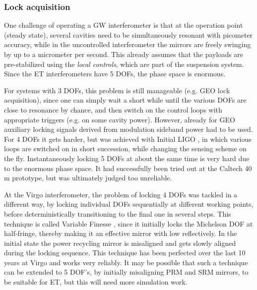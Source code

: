 

\subsubsection*{Lock acquisition}

One challenge of operating a GW interferometer is that at the operation point (steady state), several cavities need to be simultaneously resonant with picometer accuracy, while in the uncontrolled interferometer the mirrors are freely swinging by up to a micrometer per second. This already assumes that the payloads are pre-stabilized using the \emph{local controls}, which are part of the suspension system. Since the ET interferometers have 5 DOFs, the phase space is enormous.

For systems with 3 DOFs, this problem is still manageable (e.g. GEO lock acquisition), since one can simply wait a short while until the various DOFs are close to resonance by chance, and then switch on the control loops with appropriate triggers (e.g. on some cavity power). However, already for GEO auxiliary locking signals derived from modulation sideband power had to be used. For 4 DOFs it gets harder, but was achieved with Initial LIGO \cite{Evans2002}, in which various loops are switched on in short succession, while changing the sensing scheme on the fly. Instantaneously locking 5 DOFs at about the same time is very hard due to the enormous phase space. It had successfully been tried out at the Caltech 40\,m prototype, 
but was ultimately judged too unreliable.

At the Virgo interferometer, the problem of locking 4 DOFs was tackled in a different way, by locking individual DOFs sequentially at different working points, before deterministically transitioning to the final one in several steps. This technique is called Variable Finesse \cite{VariableFinesse}, since it initially locks the Michelson DOF at half-fringe, thereby making it an effective mirror with low reflectively. 
In the initial state the power recycling mirror is misaligned and gets slowly aligned during the locking sequence. This technique has been perfected over the last 10 years at Virgo and works very reliably.
It may be possible that such a technique can be extended to 5 DOF's, by initially misaligning PRM and SRM mirrors, to be suitable for ET, but this will need more simulation work.

